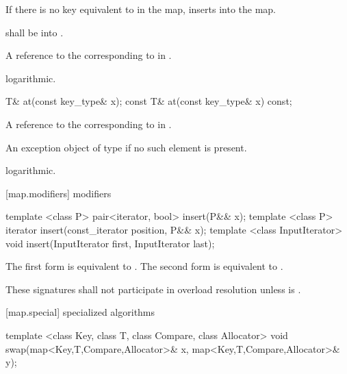 \begin{itemdescr}
\pnum
\effects
If there is no key equivalent to  in the map, inserts
into the map.

\pnum
\requires {} shall be
 into .

\pnum
\returns
A reference to the
corresponding to  in
.

\pnum
\complexity
logarithmic.
\end{itemdescr}

%
\begin{itemdecl}
T&       at(const key_type& x);
const T& at(const key_type& x) const;
\end{itemdecl}

\begin{itemdescr}
\pnum
\returns
A reference to the  corresponding to  in .

\pnum
\throws
An exception object of type  if
no such element is present.

\pnum
\complexity
logarithmic.
\end{itemdescr}

[map.modifiers]{ modifiers}

%
%
\begin{itemdecl}
template <class P> pair<iterator, bool> insert(P&& x);
template <class P> iterator insert(const_iterator position, P&& x);
template <class InputIterator>
  void insert(InputIterator first, InputIterator last);
\end{itemdecl}

\begin{itemdescr}
\pnum
\effects
The first form is equivalent to 
. The second form is
equivalent to .

\pnum
\remarks
These signatures shall not participate in overload resolution
unless  is
.
\end{itemdescr}

[map.special]{ specialized algorithms}

%
%
\begin{itemdecl}
template <class Key, class T, class Compare, class Allocator>
  void swap(map<Key,T,Compare,Allocator>& x,
            map<Key,T,Compare,Allocator>& y);
\end{itemdecl}

